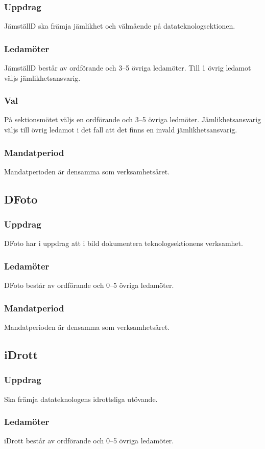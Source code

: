 \subsubsection{Uppdrag}
JämställD ska främja jämlikhet och välmående på datateknologsektionen.
\subsubsection{Ledamöter}
JämställD består av ordförande och 3--5 övriga ledamöter. Till 1 övrig ledamot väljs jämlikhetsansvarig.
\subsubsection{Val}
På sektionsmötet väljs en ordförande och 3--5 övriga ledmöter. 
Jämlikhetsansvarig väljs till övrig ledamot i det fall att det finns en invald jämlikhetsansvarig. 
\subsubsection{Mandatperiod}
Mandatperioden är densamma som verksamhetsåret.

\subsection{DFoto}
\subsubsection{Uppdrag}
DFoto har i uppdrag att i bild dokumentera teknologsektionens verksamhet.
\subsubsection{Ledamöter}
DFoto består av ordförande och 0--5 övriga ledamöter.
\subsubsection{Mandatperiod}
Mandatperioden är densamma som verksamhetsåret.

\subsection{iDrott}
\subsubsection{Uppdrag}
Ska främja datateknologens idrottsliga utövande. 
\subsubsection{Ledamöter}
iDrott består av ordförande och 0--5 övriga ledamöter. 
